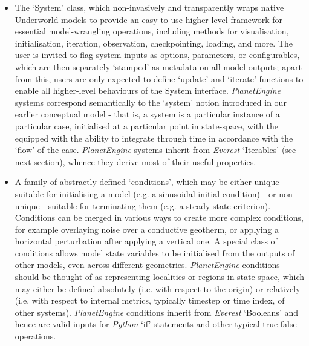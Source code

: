 \documentclass[a4paper,11pt,oneside]{book}
\begin{document}
\begin{itemize}
\item The `System' class, which non-invasively and transparently wraps native Underworld models to provide an easy-to-use higher-level framework for essential model-wrangling operations, including methods for visualisation, initialisation, iteration, observation, checkpointing, loading, and more. The user is invited to flag system inputs as options, parameters, or configurables, which are then separately `stamped' as metadata on all model outputs; apart from this, users are only expected to define `update' and `iterate' functions to enable all higher-level behaviours of the System interface. \textit{PlanetEngine} systems correspond semantically to the `system' notion introduced in our earlier conceptual model - that is, a system is a particular instance of a particular case, initialised at a particular point in state-space, with the equipped with the ability to integrate through time in accordance with the `flow' of the case. \textit{PlanetEngine} systems inherit from \textit{Everest} `Iterables' (see next section), whence they derive most of their useful properties.


\item A family of abstractly-defined `conditions', which may be either unique - suitable for initialising a model (e.g. a sinusoidal initial condition) - or non-unique - suitable for terminating them (e.g. a steady-state criterion). Conditions can be merged in various ways to create more complex conditions, for example overlaying noise over a conductive geotherm, or applying a horizontal perturbation after applying a vertical one. A special class of conditions allows model state variables to be initialised from the outputs of other models, even across different geometries. \textit{PlanetEngine} conditions should be thought of as representing localities or regions in state-space, which may either be defined absolutely (i.e. with respect to the origin) or relatively (i.e. with respect to internal metrics, typically timestep or time index, of other systems). \textit{PlanetEngine} conditions inherit from \textit{Everest} `Booleans' and hence are valid inputs for \textit{Python} `if' statements and other typical true-false operations.



\end{itemize}
\end{document}
